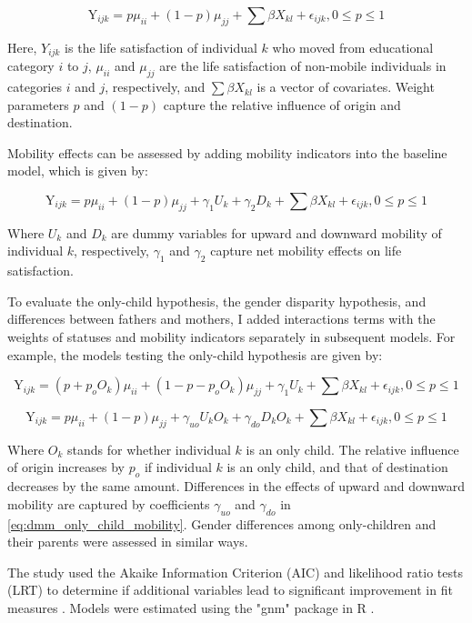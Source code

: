 \begin{equation}
    \label{eq:dmm-chapter2}
    \text{Y}_{ijk} = p \mu_{ii} + (1-p) \mu_{jj} + \sum \beta X_{kl} + \epsilon_{ijk}, 0 \leq p \leq 1
\end{equation}

Here, $Y_{ijk}$ is the life satisfaction of individual $k$ who moved from educational category $i$ to $j$, $\mu_{ii}$ and $\mu_{jj}$ are the life satisfaction of non-mobile individuals in categories $i$ and $j$, respectively, and $\sum \beta X_{kl}$ is a vector of covariates. Weight parameters $p$ and $(1-p)$ capture the relative influence of origin and destination.

Mobility effects can be assessed by adding mobility indicators into the baseline model, which is given by:

\begin{equation}
    \label{eq:dmm_mobility}
    \text{Y}_{ijk} = p \mu_{ii} + (1-p) \mu_{jj} + \gamma_{1} U_{k} + \gamma_{2} D_{k} + \sum \beta X_{kl} + \epsilon_{ijk}, 0 \leq p \leq 1
\end{equation}

Where $U_{k}$ and $D_{k}$ are dummy variables for upward and downward mobility of individual $k$, respectively, $\gamma_{1}$ and $\gamma_{2}$ capture net mobility effects on life satisfaction.

To evaluate the only-child hypothesis, the gender disparity hypothesis, and differences between fathers and mothers, I added interactions terms with the weights of statuses and mobility indicators separately in subsequent models. For example, the models testing the only-child hypothesis are given by:

\begin{equation}
    \label{eq:dmm_only_child}
    \text{Y}_{ijk} = (p + p_{o} O_{k}) \mu_{ii} + (1 - p - p_{o} O_{k}) \mu_{jj} + \gamma_{1} U_{k} + \sum \beta X_{kl} +\epsilon_{ijk}, 0 \leq p \leq 1
\end{equation}

\begin{equation}
    \label{eq:dmm_only_child_mobility}
    \text{Y}_{ijk} = p \mu_{ii} + (1-p) \mu_{jj} + \gamma_{uo} U_{k} O_{k} + \gamma_{do} D_{k} O_{k} + \sum \beta X_{kl} + \epsilon_{ijk}, 0 \leq p \leq 1
\end{equation}

Where $O_{k}$ stands for whether individual $k$ is an only child. The relative influence of origin increases by $p_{o}$ if individual $k$ is an only child, and that of destination decreases by the same amount. Differences in the effects of upward and downward mobility are captured by coefficients $\gamma_{uo}$ and $\gamma_{do}$ in \ref{eq:dmm_only_child_mobility}. Gender differences among only-children and their parents were assessed in similar ways.

The study used the Akaike Information Criterion (AIC) and likelihood ratio tests (LRT) to determine if additional variables lead to significant improvement in fit measures \parencite{sobelSocialMobilityFertility1985}. Models were estimated using the "gnm" package in R \parencite{turnerGnmGeneralizedNonlinear2005}.
